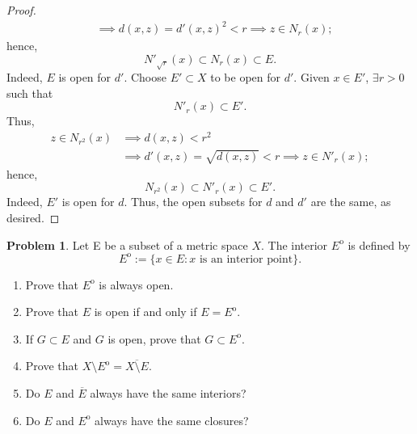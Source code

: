 \documentclass{amsart}
\theoremstyle{definition}
\newtheorem{problem}{Problem}
\begin{document}
\begin{proof}
\begin{align*}
        &\implies d(x,z) = d'(x,z)^2 < r \implies z \in N_{r}(x);
    \end{align*}
    hence, 
    \[
    N'_{\sqrt{r}}(x) \subset N_r(x) \subset E.
    \]
    Indeed, $E$ is open for $d'$. Choose $E' \subset X$ to be open for $d'$. Given $x \in E'$, $\exists r > 0$ such that
    \[
    N'_r(x) \subset E'.
    \]
    Thus,
    \begin{align*}
        z \in N_{r^2}(x) &\implies d(x,z) < r^2 \\
        &\implies d'(x,z) = \sqrt{d(x,z)} < r \implies z \in N'_{r}(x);
    \end{align*}
    hence, 
    \[
    N_{r^2}(x) \subset N'_{r}(x) \subset E'.
    \]
    Indeed, $E'$ is open for $d$. Thus, the open subsets for $d$ and $d'$ are the same, as desired.
\end{proof}

\begin{problem}
    Let E be a subset of a metric space $X$. The interior $E^{\mathrm{o}}$ is defined by 
    \[
    E^{\mathrm{o}} := \{x \in E : \text{$x$ is an interior point}\}. 
    \]
    \begin{enumerate}[label = (\alph*)]
        \item Prove that $E^{\mathrm{o}}$ is always open.
        \item Prove that $E$ is open if and only if $E = E^{\mathrm{o}}$.
        \item If $G \subset E$ and $G$ is open, prove that $G \subset E^{\mathrm{o}}$.
        \item Prove that $X \setminus E^{\mathrm{o}} = \overline{X \setminus E}$.
        \item Do $E$ and $\overline{E}$ always have the same interiors?
        \item Do $E$ and $E^{\mathrm{o}}$ always have the same closures?
    \end{enumerate}
\end{problem}
\end{document}
